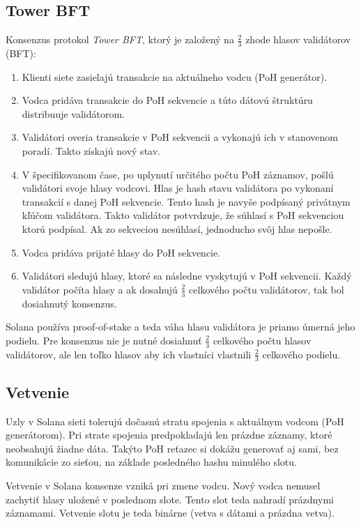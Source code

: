 \subsection{Tower BFT}\label{subsec:towerbft}

Konsenzus protokol \textit{Tower BFT}, ktorý je založený na $\frac{2}{3}$ zhode hlasov validátorov (BFT):
\begin{enumerate}
	\item Klienti siete zasielajú transakcie na aktuálneho vodcu (PoH generátor).
	\item Vodca pridáva transakcie do PoH sekvencie a túto dátovú štruktúru distribuuje validátorom.
	\item Validátori overia transakcie v PoH sekvencii a vykonajú ich v stanovenom poradí. Takto získajú nový stav.
	\item V špecifikovanom čase, po uplynutí určitého počtu PoH záznamov, pošlú validátori svoje hlasy vodcovi. Hlas je hash stavu validátora po vykonaní transakcií s danej PoH sekvencie. Tento hash je navyše podpísaný privátnym kľúčom validátora. Takto validátor potvrdzuje, že súhlasí s PoH sekvenciou ktorú podpísal. Ak zo sekveciou nesúhlasí, jednoducho svôj hlas nepošle.
	\item Vodca pridáva prijaté hlasy do PoH sekvencie.
	\item Validátori sledujú hlasy, ktoré sa následne vyskytujú v PoH sekvencii. Každý validátor počíta hlasy a ak dosahujú $\frac{2}{3}$ celkového počtu validátorov, tak bol dosiahnutý konsenzus.
\end{enumerate}
Solana používa proof-of-stake a teda váha hlasu validátora je priamo úmerná jeho podielu. Pre konsenzus nie je nutné dosiahnuť $\frac{2}{3}$ celkového počtu hlasov validátorov, ale len toľko hlasov aby ich vlastníci vlastnili $\frac{2}{3}$ celkového podielu.

\subsection{Vetvenie}
Uzly v Solana sieti tolerujú dočasnú stratu spojenia s aktuálnym vodcom (PoH generátorom). Pri strate spojenia predpokladajú len prázdne záznamy, ktoré neobsahujú žiadne dáta. Takýto PoH reťazec si dokážu generovať aj sami, bez komunikácie zo sieťou, na základe posledného hashu minulého slotu.

Vetvenie v Solana konsenze vzniká pri zmene vodcu. Nový vodca nemusel zachytiť hlasy uložené v poslednom slote. Tento slot teda nahradí prázdnymi záznamami. Vetvenie slotu je teda binárne (vetva s dátami a prázdna vetva). 


